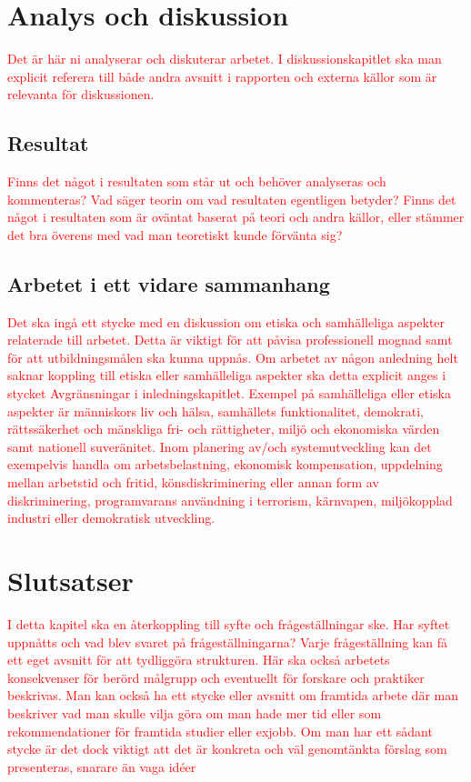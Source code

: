 \documentclass[a4paper,12pt,oneside,final]{extbook}
\begin{document}
\chapter{Analys och diskussion}

\textcolor{red}{Det är här ni analyserar och diskuterar arbetet. I diskussionskapitlet ska man explicit referera till både
andra avsnitt i rapporten och externa källor som är relevanta för diskussionen.
}


\section{Resultat}

\textcolor{red}{Finns det något i resultaten som står ut och behöver analyseras och kommenteras? Vad säger teorin
om vad resultaten egentligen betyder? Finns det något i resultaten som är oväntat baserat på teori och
andra källor, eller stämmer det bra överens med vad man teoretiskt kunde förvänta sig?
}
\section{Arbetet i ett vidare sammanhang}

\textcolor{red}{Det ska ingå ett stycke med en diskussion om etiska och samhälleliga aspekter relaterade till arbetet.
Detta är viktigt för att påvisa professionell mognad samt för att utbildningsmålen ska kunna uppnås.
Om arbetet av någon anledning helt saknar koppling till etiska eller samhälleliga aspekter ska detta
explicit anges i stycket Avgränsningar i inledningskapitlet.
Exempel på samhälleliga eller etiska aspekter är människors liv och hälsa, samhällets funktionalitet,
demokrati, rättssäkerhet och mänskliga fri- och rättigheter, miljö och ekonomiska värden samt
nationell suveränitet. Inom planering av/och systemutveckling kan det exempelvis handla om arbetsbelastning,
ekonomisk kompensation, uppdelning mellan arbetstid och fritid, könsdiskriminering eller
annan form av diskriminering, programvarans användning i terrorism, kärnvapen, miljökopplad industri
eller demokratisk utveckling.}

\chapter{Slutsatser}

\textcolor{red}{I detta kapitel ska en återkoppling till syfte och frågeställningar ske. Har syftet uppnåtts och vad blev
svaret på frågeställningarna? Varje frågeställning kan få ett eget avsnitt för att tydliggöra strukturen.
Här ska också arbetets konsekvenser för berörd målgrupp och eventuellt för forskare och praktiker
beskrivas. Man kan också ha ett stycke eller avsnitt om framtida arbete där man beskriver vad man
skulle vilja göra om man hade mer tid eller som rekommendationer för framtida studier eller exjobb.
Om man har ett sådant stycke är det dock viktigt att det är konkreta och väl genomtänkta förslag som
presenteras, snarare än vaga idéer}
\end{document}
